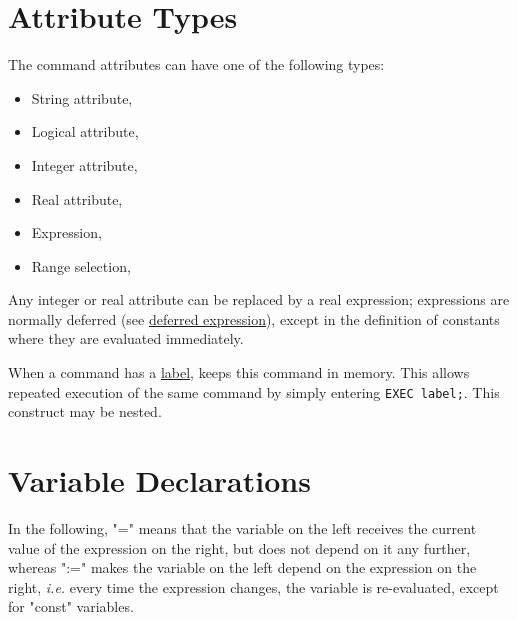 \section{Attribute Types}
The command attributes can have one of the following types:
\begin{itemize}
  \item String attribute,
  \item Logical attribute,
  \item Integer attribute,
  \item Real attribute,
  \item Expression,
  \item Range selection,
\end{itemize}

Any integer or real attribute can be replaced by a real expression;
expressions are normally deferred (see
\hyperref[sec:defer]{deferred expression}), except in the   
definition of constants where they are evaluated immediately.

When a command has a \hyperref[sec:label]{label}, \madx keeps this
command in memory. This allows repeated execution of the same command by
simply entering \texttt{EXEC label;}. This construct may be nested. 



\section{Variable Declarations}
\label{subsec:var_declarations}

In the following, "=" means that the variable on the left receives the
current value of the expression on the right, but does not depend on it
any further, whereas ":=" makes the variable on the left depend on the
expression on the right, \textsl{i.e.} every time the expression
changes, the variable is re-evaluated, except for "const" variables.



